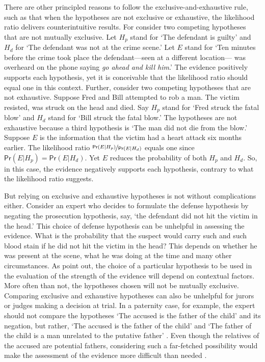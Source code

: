 \documentclass{article}
\newcommand{\pr}{\mathsf{Pr}}
\begin{document}
There are other principled reasons to follow the exclusive-and-exhaustive rule, such as that when the hypotheses are not exclusive or exhaustive, 
the likelihood ratio delivers counterintuitive results.
For consider two competing hypotheses %
that are not mutually exclusive.
Let $H_p$ stand for `The defendant is guilty' and $H_d$ for `The defendant was not at the crime scene.' 
Let $E$ stand for `Ten minutes before the crime took place the defendant---seen at a different location--- was overheard on the phone saying \emph{go ahead and kill him}.' 
The evidence positively supports each hypothesis, yet it is conceivable that the likelihood ratio should equal one in this context. %
Further, consider two competing hypotheses that are not exhaustive.
Suppose Fred and Bill attempted to rob a man. The victim resisted, was struck on the head and died. Say $H_p$ stand for `Fred struck the fatal blow' and $H_d$ stand for `Bill struck the fatal blow.' The hypotheses are not exhaustive because a third hypothesis is  `The man did not die from the blow.' Suppose $E$ is the information that the victim had a heart attack six months earlier. The likelihood ratio $\nicefrac{\pr(E \vert H_p)}{\pr(E \vert H_d)}$  equals one since  $\pr(E\vert H_p)=\pr(E\vert H_d)$. Yet $E$ reduces the probability of both $H_p$ and $H_d$. So, in this case, the evidence negatively supports each hypothesis, contrary to what the likelihood ratio suggests.  

But relying on exclusive and exhaustive hypotheses is not without complications either. Consider an expert who decides to formulate the defense hypothesis by negating the prosecution hypothesis, say, `the defendant did not hit the victim in the head.' This choice of defense hypothesis can be unhelpful in assessing the evidence.
What is the probability that the suspect would carry such and such blood stain if he did not hit the victim in the head? This depends on whether he was present at the scene, what he was doing at the time and many other circumstances. %
As \citet{evett2000MoreHierarchyPropositions} point out, the choice of a particular hypothesis to be used in the evaluation of the strength of the evidence 
will depend on contextual factors. %
More often than not, the hypotheses chosen will not be mutually exclusive. 
Comparing exclusive and exhaustive hypotheses can also be unhelpful for jurors or judges making a decision at trial.
In a paternity case, for example, %
the expert should not compare the hypotheses `The accused is the father of the child' and  its negation, but rather, `The accused is the father of the child' and  `The father of the child is a man unrelated to the putative father' \citep{biedermann2014UseLikelihoodRatio}. 
Even though the relatives of the accused are potential fathers, considering such a far-fetched possibility would make the assessment of the evidence more difficult than needed  %
\citep{evett2000MoreHierarchyPropositions}. 
\end{document}
